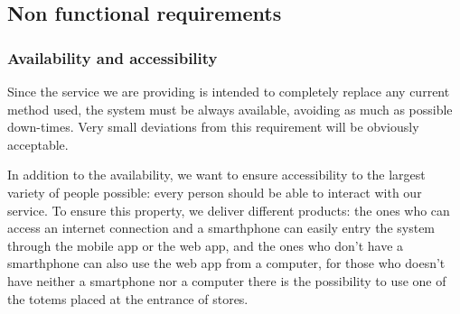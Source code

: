 %
%
\subsection{Non functional requirements}
\label{subsect:softwaresystemattributes}

\subsubsection{Availability and accessibility}
\label{subsubsect:availabilityandaccessibility}

Since the service we are providing is intended to completely replace any current method used, the system must be always available, avoiding as much as possible down-times. Very small deviations from this requirement will be obviously acceptable.

In addition to the availability, we want to ensure accessibility to the largest variety of people possible: every person should be able to interact with our service. To ensure this property, we deliver different products: the ones who can access an internet connection and a smarthphone can easily entry the system through the mobile app or the web app, and the ones who don't have a smarthphone can also use the web app from a computer, for those who doesn't have neither a smartphone nor a computer there is the possibility to use one of the totems placed at the entrance of stores.

